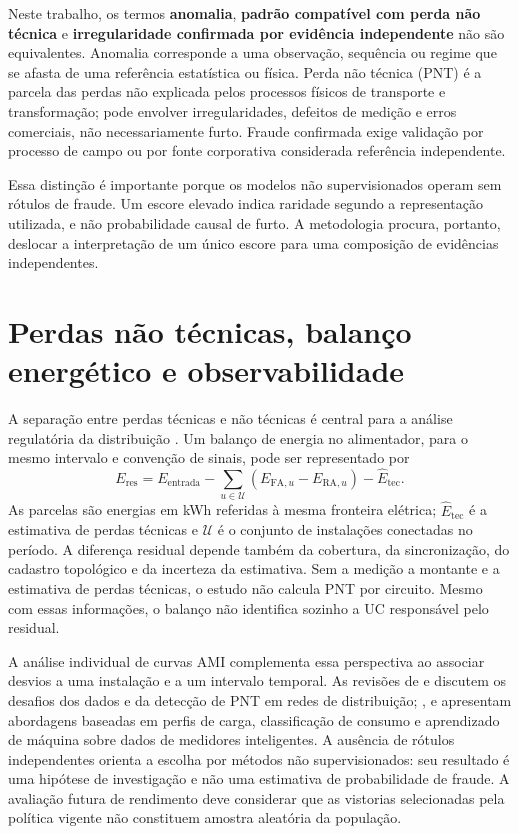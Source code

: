 Neste trabalho, os termos \textbf{anomalia}, \textbf{padrão compatível com perda não técnica} e \textbf{irregularidade confirmada por evidência independente} não são equivalentes. Anomalia corresponde a uma observação, sequência ou regime que se afasta de uma referência estatística ou física. Perda não técnica (PNT) é a parcela das perdas não explicada pelos processos físicos de transporte e transformação; pode envolver irregularidades, defeitos de medição e erros comerciais, não necessariamente furto. Fraude confirmada exige validação por processo de campo ou por fonte corporativa considerada referência independente.

Essa distinção é importante porque os modelos não supervisionados operam sem rótulos de fraude. Um escore elevado indica raridade segundo a representação utilizada, e não probabilidade causal de furto. A metodologia procura, portanto, deslocar a interpretação de um único escore para uma composição de evidências independentes.

\section{Perdas não técnicas, balanço energético e observabilidade}\label{pnt-balanco}

A separação entre perdas técnicas e não técnicas é central para a análise regulatória da distribuição \autocite{aneel2026,aneelren1000,glauner2017}. Um balanço de energia no alimentador, para o mesmo intervalo e convenção de sinais, pode ser representado por
\begin{equation}\label{balanco}
E_{\mathrm{res}}=E_{\mathrm{entrada}}-\sum_{u\in\mathcal U}(E_{\mathrm{FA},u}-E_{\mathrm{RA},u})-\widehat E_{\mathrm{tec}}.
\end{equation}
As parcelas são energias em kWh referidas à mesma fronteira elétrica; $\widehat E_{\mathrm{tec}}$ é a estimativa de perdas técnicas e $\mathcal U$ é o conjunto de instalações conectadas no período. A diferença residual depende também da cobertura, da sincronização, do cadastro topológico e da incerteza da estimativa. Sem a medição a montante e a estimativa de perdas técnicas, o estudo não calcula PNT por circuito. Mesmo com essas informações, o balanço não identifica sozinho a UC responsável pelo residual.

A análise individual de curvas AMI complementa essa perspectiva ao associar desvios a uma instalação e a um intervalo temporal. As revisões de \textcite{glauner2017} e \textcite{messinis2018} discutem os desafios dos dados e da detecção de PNT em redes de distribuição; \textcite{villar2017}, \textcite{jokar2016} e \textcite{buzau2019} apresentam abordagens baseadas em perfis de carga, classificação de consumo e aprendizado de máquina sobre dados de medidores inteligentes. A ausência de rótulos independentes orienta a escolha por métodos não supervisionados: seu resultado é uma hipótese de investigação e não uma estimativa de probabilidade de fraude. A avaliação futura de rendimento deve considerar que as vistorias selecionadas pela política vigente não constituem amostra aleatória da população.

